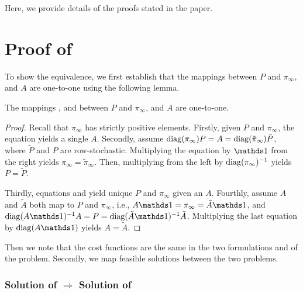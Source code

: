 \documentclass[journal]{IEEEtran}
\newcommand{\pii}{\pi_\infty}
\begin{document}


%


\clearpage

\appendices

Here, we provide details of the proofs stated in the paper.

\section{Proof of }

To show the equivalence, we first establish that the mappings between $P$ and
$\pii$, and $A$ are one-to-one using the following lemma.
\begin{lemma}
    The mappings ,  and
     between $P$ and $\pi_\infty$, and $A$ are one-to-one.
    \label{lemma:unique_mapping}
\end{lemma}
\begin{proof}
    Recall that $\pii$ has strictly positive elements.  Firstly, given $P$ and
    $\pii$, the equation  yields a single $A$. Secondly,
    assume $\operatorname{diag}(\pi_\infty) P = A = \operatorname{diag}(\tilde \pi_\infty) \tilde P$, where
    $\tilde P$ and $P$ are row-stochastic.  Multiplying the equation by $\ones$
    from the right yields $\pi_\infty = \tilde \pi_\infty$. Then, multiplying
    from the left by $\operatorname{diag}(\pi_\infty)^{-1}$ yields $P = \tilde P$.

    Thirdly, equations  and  yield
    unique $P$ and $\pii$ given an $A$. Fourthly, assume $A$ and $\tilde A$
    both map to $P$ and $\pii$, i.e., $A\ones = \pii = \tilde A \ones$, and
    $\diag{A\ones}^{-1} A = P = \diag{\tilde A\ones}^{-1} \tilde A$.
    Multiplying the last equation by $\diag{A\ones}$ yields $A = \tilde A$.
\end{proof}
Then we note that the cost functions are the same in the two formulations
 and  of the problem.  Secondly, we
map feasible solutions between the two problems.
\subsubsection{Solution of  $\Rightarrow$ Solution of
}
\end{document}
